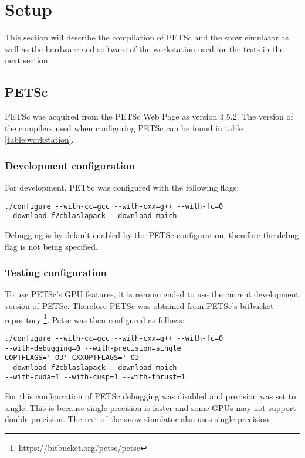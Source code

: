 \section{Setup}

This section will describe the compilation of PETSc and the snow simulator as well 
as the hardware and software of the workstation used for the tests in the next section. 

\subsection{PETSc}

PETSc was acquired from the PETSc Web Page\cite{petsc-web-page} as version 3.5.2. 
The version of the compilers used when configuring PETSc can be found in table 
\ref{table:workstation}.

\subsubsection{Development configuration}

For development, PETSc was configured with the following flags:
\lstset{language=bash}
\begin{lstlisting}
./configure --with-cc=gcc --with-cxx=g++ --with-fc=0 
--download-f2cblaslapack --download-mpich
\end{lstlisting}
Debugging is by default enabled by the PETSc configuration, therefore the debug 
flag is not being specified.

\subsubsection{Testing configuration}

To use PETSc's GPU features, it is recommended to use the current development 
version of PETSc. Therefore PETSc was obtained from PETSc's bitbucket repository
\footnote{https://bitbucket.org/petsc/petsc}. Petsc was then configured as follows:
\lstset{language=bash}
\begin{lstlisting}
./configure --with-cc=gcc --with-cxx=g++ --with-fc=0
--with-debugging=0 --with-precision=single
COPTFLAGS='-O3' CXXOPTFLAGS='-O3' 
--download-f2cblaslapack --download-mpich
--with-cuda=1 --with-cusp=1 --with-thrust=1
\end{lstlisting}
For this configuration of PETSc debugging was disabled and precision was set to 
single. This is because single precision is faster and some GPUs may not support 
double precision. The rest of the snow simulator also uses single precision.

